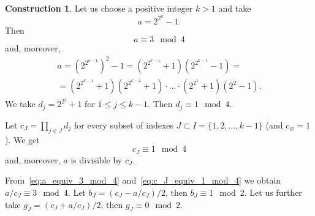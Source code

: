 \documentclass[a4paper,14pt]{article} %
\theoremstyle{plain}
\theoremstyle{definition}
\newtheorem{construction}[theorem]{Construction}
\begin{document}
\begin{construction}
	\label{con:planar_set_with_minimeter_1}
	Let us choose a positive integer $k > 1$ and take
	\begin{equation}
		a = 2^{2^k} - 1
		.
	\end{equation}
	Then
	\begin{equation}
		\label{eq:a_equiv_3_mod_4}
		a \equiv 3 \mod 4
	\end{equation}
	and, moreover,
	\begin{multline}
		a = \left(2^{2^{k-1}}\right)^2 - 1
		=
		\left(2^{2^{k-1}} + 1\right) \left(2^{2^{k-1}} - 1\right)
		=
		\\=
		\left(2^{2^{k-1}} + 1\right) \left(2^{2^{k-2}} + 1\right) \cdot ... \cdot \left(2^{2^1} + 1\right) \left(2^2 - 1\right)
		.
	\end{multline}
	We take $d_j = 2^{2^j} + 1$ for $1 \leq j \leq k-1$.
	Then $d_j \equiv 1 \mod 4$.

	Let $c_J = \prod_{j\in J} d_j$ for every subset of indexes $J\subset I = \{1,2,...,k-1\}$
	(and  $c_\varnothing = 1$).
	We get
	\begin{equation}
		\label{eq:c_J_equiv_1_mod_4}
		c_J\equiv 1 \mod{4}
	\end{equation}
	and, moreover, $a$ is divisible by $c_J$.


	From~\eqref{eq:a_equiv_3_mod_4} and~\eqref{eq:c_J_equiv_1_mod_4} we obtain $a/c_J \equiv 3 \mod 4$.
	Let $b_J = (c_J - a/c_J)/2$, then $b_J \equiv 1 \mod 2$.
	Let us further take $g_J = (c_J + a/c_J)/2$, then $g_J \equiv 0 \mod 2$.


\end{construction}
\end{document}
